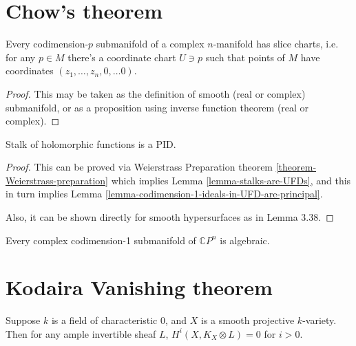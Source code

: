 \section{Chow's theorem}
\label{section-chow-theorem}

\begin{proposition}
\label{proposition-slice-charts}
Every codimension-$p$ submanifold of a complex $n$-manifold has slice charts,
i.e. for any $p \in M$ there's a coordinate chart $U \ni p$ such that points of
$M$ have coordinates $(z_1,\ldots,z_n,0,\ldots 0)$.
\end{proposition}

\begin{proof}
This may be taken as the definition of smooth (real or complex) submanifold, or
as a proposition using inverse function theorem (real or complex).
\end{proof}

\begin{proposition}
\label{proposition-stalk-is-PID}
Stalk of holomorphic functions is a PID.
\end{proposition}

\begin{proof}
This can be proved via Weierstrass Preparation theorem
\ref{theorem-Weierstrass-preparation} which implies
 Lemma \ref{lemma-stalks-are-UFDs}, and this in turn implies Lemma 
\ref{lemma-codimension-1-ideals-in-UFD-are-principal}.

Also, it can be shown directly for smooth hypersurfaces
 as in \cite{lec} Lemma 3.38.
\end{proof}

\begin{theorem}
\label{theorem-Chow-for-hypersurfaces}
Every complex codimension-1 submanifold of $\mathbb{C}P^{n}$ is algebraic.
\end{theorem}

\section{Kodaira Vanishing theorem}
\label{section-Kodaira-vanishing-theorem}

\begin{theorem}
\label{theorem-Kodaira-vanishing}
\begin{reference}
\cite[21.5.8]{sea}
\end{reference}
Suppose $k$ is a field of characteristic 0, and $X$ is a
smooth projective $k$-variety. Then for any ample invertible sheaf $L$,
$H^{i}(X,K_X \otimes L)=0$ for $i>0$.
\end{theorem}

